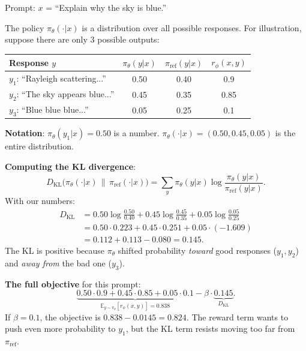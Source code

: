 \begin{example}
    Prompt: $x$ = ``Explain why the sky is blue.''

    The policy $\pi_\theta(\cdot|x)$ is a distribution over all possible responses. For illustration, suppose there are only 3 possible outputs:
    \begin{center}
        \begin{tabular}{l|cc|c}
            Response $y$                       & $\pi_\theta(y|x)$ & $\pi_{\text{ref}}(y|x)$ & $r_\phi(x,y)$ \\
            \hline
            $y_1$: ``Rayleigh scattering...''  & 0.50              & 0.40                    & 0.9           \\
            $y_2$: ``The sky appears blue...'' & 0.45              & 0.35                    & 0.85          \\
            $y_3$: ``Blue blue blue...''       & 0.05              & 0.25                    & 0.1           \\
        \end{tabular}
    \end{center}

    \textbf{Notation}: $\pi_\theta(y_1|x) = 0.50$ is a number. $\pi_\theta(\cdot|x) = (0.50, 0.45, 0.05)$ is the entire distribution.

    \textbf{Computing the KL divergence}:
    \[
        D_{\mathrm{KL}}\bigl(\pi_\theta(\cdot|x) \,\|\, \pi_{\text{ref}}(\cdot|x)\bigr) = \sum_{y} \pi_\theta(y|x) \log \frac{\pi_\theta(y|x)}{\pi_{\text{ref}}(y|x)}.
    \]
    With our numbers:
    \begin{align*}
        D_{\mathrm{KL}} & = 0.50 \log\frac{0.50}{0.40} + 0.45 \log\frac{0.45}{0.35} + 0.05 \log\frac{0.05}{0.25} \\
                        & = 0.50 \cdot 0.223 + 0.45 \cdot 0.251 + 0.05 \cdot (-1.609)                            \\
                        & = 0.112 + 0.113 - 0.080 = 0.145.
    \end{align*}
    The KL is positive because $\pi_\theta$ shifted probability \emph{toward} good responses ($y_1, y_2$) and \emph{away from} the bad one ($y_3$).

    \textbf{The full objective} for this prompt:
    \[
        \underbrace{0.50 \cdot 0.9 + 0.45 \cdot 0.85 + 0.05 \cdot 0.1}_{\mathbb{E}_{y \sim \pi_\theta}[r_\phi(x,y)] = 0.838} - \beta \cdot \underbrace{0.145}_{D_{\mathrm{KL}}}.
    \]
    If $\beta = 0.1$, the objective is $0.838 - 0.0145 = 0.824$. The reward term wants to push even more probability to $y_1$, but the KL term resists moving too far from $\pi_{\text{ref}}$.
\end{example}

